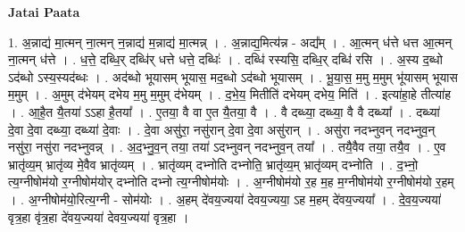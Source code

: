 \documentclass[17pt]{extarticle}
\begin{document}
\textbf{Jatai Paata} \newline

1. अ॒न्नाद्य॑ मा॒त्मन् ना॒त्मन् न॒न्नाद्य॑ म॒न्नाद्य॑ मा॒त्मन्न् । . अ॒न्नाद्य॒मित्य॑न्न - अद्य᳚म् । . आ॒त्मन् ध॑त्ते धत्त आ॒त्मन् ना॒त्मन् ध॑त्ते । . ध॒त्ते॒ दब्धि॒र् दब्धि॑र् धत्ते धत्ते॒ दब्धिः॑ । . दब्धि॑ रस्यसि॒ दब्धि॒र् दब्धि॑ रसि । . अ॒स्य द॒ब्धो ऽद॑ब्धो ऽस्य॒स्यद॑ब्धः । . अद॑ब्धो भूयासम् भूयास॒ मद॒ब्धो ऽद॑ब्धो भूयासम् । . भू॒या॒स॒ म॒मु म॒मुम् भू॑यासम् भूयास म॒मुम् । . अ॒मुम् द॑भेयम् दभेय म॒मु म॒मुम् द॑भेयम् । . द॒भे॒य॒ मितीति॑ दभेयम् दभेय॒ मिति॑ । . इत्या॑हा॒हे तीत्या॑ह । . आ॒है॒त यै॒तया॑ ऽऽहा है॒तया᳚ । . ए॒तया॒ वै वा ए॒त यै॒तया॒ वै । . वै दब्ध्या॒ दब्ध्या॒ वै वै दब्ध्या᳚ । . दब्ध्या॑ दे॒वा दे॒वा दब्ध्या॒ दब्ध्या॑ दे॒वाः । . दे॒वा असु॑रा॒ नसु॑रान् दे॒वा दे॒वा असु॑रान् । . असु॑रा नदभ्नुवन् नदभ्नुव॒न् नसु॑रा॒ नसु॑रा नदभ्नुवन्न् । . अ॒द॒भ्नु॒व॒न् तया॒ तया॑ ऽदभ्नुवन् नदभ्नुव॒न् तया᳚ । . तयै॒वैव तया॒ तयै॒व । . ए॒व भ्रातृ॑व्य॒म् भ्रातृ॑व्य मे॒वैव भ्रातृ॑व्यम् । . भ्रातृ॑व्यम् दभ्नोति दभ्नोति॒ भ्रातृ॑व्य॒म् भ्रातृ॑व्यम् दभ्नोति । . द॒भ्नो॒ त्य॒ग्नीषोम॑यो र॒ग्नीषोम॑योर् दभ्नोति दभ्नो त्य॒ग्नीषोम॑योः । . अ॒ग्नीषोम॑यो र॒ह म॒ह म॒ग्नीषोम॑यो र॒ग्नीषोम॑यो र॒हम् । . अ॒ग्नीषोम॑यो॒रित्य॒ग्नी - सोम॑योः । . अ॒हम् दे॑वय॒ज्यया॑ देवय॒ज्यया॒ ऽह म॒हम् दे॑वय॒ज्यया᳚ । . दे॒व॒य॒ज्यया॑ वृत्र॒हा वृ॑त्र॒हा दे॑वय॒ज्यया॑ देवय॒ज्यया॑ वृत्र॒हा । \newline
\end{document}
